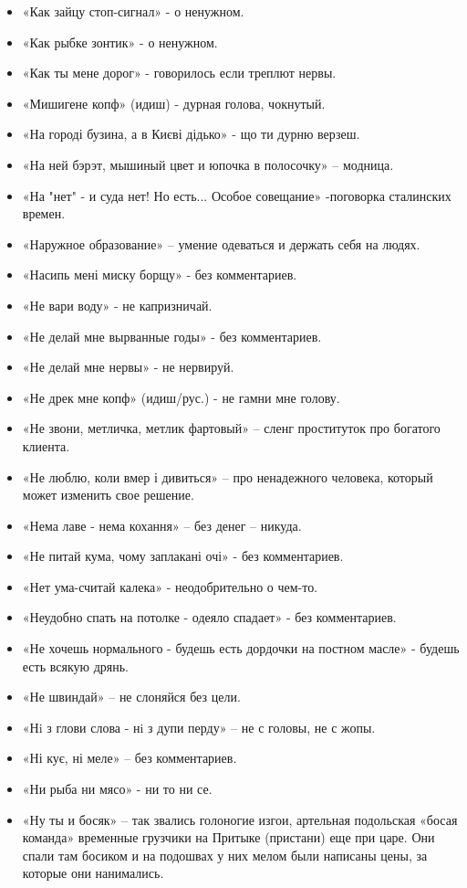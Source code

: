 \begin{itemize}
\item  «Как зайцу стоп-сигнал» - о ненужном.
\item  «Как рыбке зонтик» - о ненужном.
\item  «Как ты мене дорог» - говорилось если треплют  нервы.
\item  «Мишигене копф» (идиш) - дурная голова, чокнутый.
\item  «На городі бузина, а в Києві дідько» - що ти дурню верзеш.
\item  «На ней бэрэт, мышиный цвет и юпочка в полосочку» – модница.
\item  «На "нет" - и суда нет! Но есть... Особое совещание» -поговорка сталинских времен.
\item  «Наружное образование» – умение одеваться и держать себя на людях.
\item  «Насипь мені миску борщу» - без комментариев.
\item  «Не вари воду» - не капризничай.
\item  «Не делай мне вырванные годы» - без комментариев. 
\item  «Не делай мне нервы» - не нервируй.
\item  «Не дрек мне копф» (идиш/рус.) - не гамни мне голову. 
\item  «Не звони, метличка, метлик фартовый» – сленг проституток про богатого клиента.
\item  «Не люблю, коли вмер і дивиться» – про ненадежного человека, который может изменить свое решение.
\item  «Нема лаве - нема кохання» – без денег – никуда.
\item  «Не питай кума, чому заплакані очі» - без комментариев.
\item  «Нет ума-считай калека» - неодобрительно о чем-то.
\item  «Неудобно спать на потолке - одеяло спадает» - без комментариев.
\item  «Не хочешь нормального - будешь есть дордочки на постном масле» - будешь есть всякую дрянь.
\item  «Не швиндай» – не слоняйся без цели.
\item  «Нi з глови слова - нi з дупи перду» – не с головы, не с жопы.
\item  «Ні кує, ні меле» – без комментариев.
\item  «Ни рыба ни мясо» - ни то ни се.
\item  «Ну ты и босяк» – так звались голоногие изгои, артельная подольская «босая команда» временные грузчики на Притыке (пристани) еще при царе. Они спали там босиком и на подошвах у них мелом были написаны цены, за которые они нанимались.

\end{itemize}
